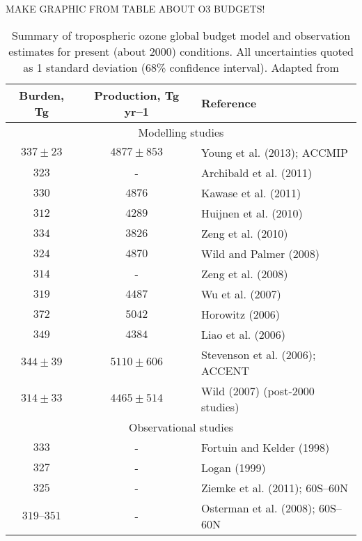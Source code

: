 \documentclass[11pt,a4paper]{article}
\begin{document}
MAKE GRAPHIC FROM TABLE ABOUT O3 BUDGETS!

\begin{table}[h] %
\centering
\caption{Summary of tropospheric ozone global budget model and observation estimates for present (about 2000) conditions. All uncertainties quoted as 1 standard deviation (68\% confidence interval). Adapted from \citep{Myhre2013}}
\label{tab:O3budget}
\begin{tabular}{ccl}
\hline
Burden, Tg & Production, Tg yr–1 & Reference \\
\hline
\multicolumn{3}{c}{Modelling studies} \\
$337\pm23$  & $4877\pm853$ & Young et al. (2013); ACCMIP \\
$323$	    & -	           & Archibald et al. (2011) \\
$330$	    & $4876$       & Kawase et al. (2011) \\
$312$       & $4289$       & Huijnen et al. (2010) \\
$334$       & $3826$       & Zeng et al. (2010) \\
$324$       & $4870$       & Wild and Palmer (2008) \\
$314$       & -	           & Zeng et al. (2008) \\
$319$	    & $4487$	   & Wu et al. (2007) \\
$372$	    & $5042$       & Horowitz (2006) \\
$349$	    & $4384$	   & Liao et al. (2006) \\
$344\pm39$	& $5110\pm606$ & Stevenson et al. (2006); ACCENT \\
$314\pm33$	& $4465\pm514$ & Wild (2007) (post-2000 studies) \\
\hline
\multicolumn{3}{c}{Observational studies} \\
$333$   	& -	           & Fortuin and Kelder (1998) \\
$327$	    & -	           & Logan (1999) \\
$325$	    & -	           & Ziemke et al. (2011); 60S–60N \\
$319–351$	& -	           & Osterman et al. (2008); 60S–60N \\
\hline
\end{tabular}
\end{table}
\end{document}
